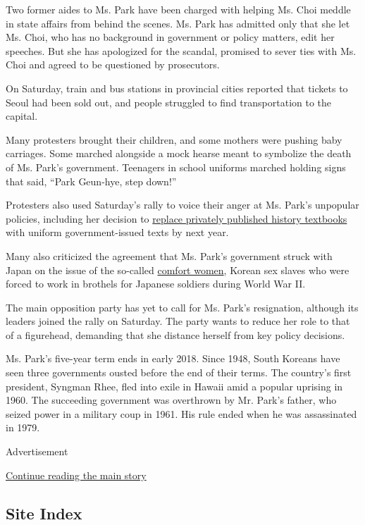 Two former aides to Ms. Park have been charged with helping Ms. Choi
meddle in state affairs from behind the scenes. Ms. Park has admitted
only that she let Ms. Choi, who has no background in government or
policy matters, edit her speeches. But she has apologized for the
scandal, promised to sever ties with Ms. Choi and agreed to be
questioned by prosecutors.

On Saturday, train and bus stations in provincial cities reported that
tickets to Seoul had been sold out, and people struggled to find
transportation to the capital.

Many protesters brought their children, and some mothers were pushing
baby carriages. Some marched alongside a mock hearse meant to symbolize
the death of Ms. Park's government. Teenagers in school uniforms marched
holding signs that said, ``Park Geun-hye, step down!''

Protesters also used Saturday's rally to voice their anger at Ms. Park's
unpopular policies, including her decision to
\href{http://www.nytimes3xbfgragh.onion/2015/10/13/world/asia/south-korea-to-issue-state-history-textbooks-rejecting-private-publishers.html}{replace
privately published history textbooks} with uniform government-issued
texts by next year.

Many also criticized the agreement that Ms. Park's government struck
with Japan on the issue of the so-called
\href{http://www.nytimes3xbfgragh.onion/2015/12/29/world/asia/comfort-women-south-korea-japan.html}{comfort
women}, Korean sex slaves who were forced to work in brothels for
Japanese soldiers during World War II.

The main opposition party has yet to call for Ms. Park's resignation,
although its leaders joined the rally on Saturday. The party wants to
reduce her role to that of a figurehead, demanding that she distance
herself from key policy decisions.

Ms. Park's five-year term ends in early 2018. Since 1948, South Koreans
have seen three governments ousted before the end of their terms. The
country's first president, Syngman Rhee, fled into exile in Hawaii amid
a popular uprising in 1960. The succeeding government was overthrown by
Mr. Park's father, who seized power in a military coup in 1961. His rule
ended when he was assassinated in 1979.

Advertisement

\protect\hyperlink{after-bottom}{Continue reading the main story}

\hypertarget{site-index}{%
\subsection{Site Index}\label{site-index}}

